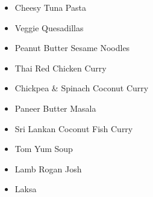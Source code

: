 \begin{itemize}
  \item \todo Cheesy Tuna Pasta
  \item \todo Veggie Quesadillas
  \item \todo Peanut Butter Sesame Noodles
\end{itemize}

\begin{itemize}
  \item \todo Thai Red Chicken Curry
  \item \todo Chickpea \& Spinach Coconut Curry
  \item \todo Paneer Butter Masala
  \item \todo Sri Lankan Coconut Fish Curry
  \item \todo Tom Yum Soup
  \item \todo Lamb Rogan Josh
  \item \todo Laksa
\end{itemize}
